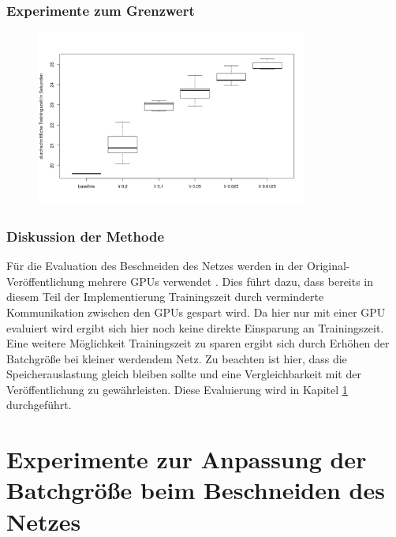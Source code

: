  
 
 \subsubsection{Experimente zum Grenzwert}


\begin{figure}[h]
 \centering
 \includegraphics[width=0.8\textwidth]{KapitelPartB/Images/lr1.png}
 \label{ref:lra}
\end{figure}



 

\subsubsection{Diskussion der Methode}

Für die Evaluation des Beschneiden des Netzes werden in der Original-Veröffentlichung mehrere GPUs verwendet \cite{prunetrain}. Dies führt dazu, dass bereits in diesem Teil der Implementierung Trainingszeit durch verminderte Kommunikation zwischen den GPUs gespart wird. Da hier nur mit einer GPU evaluiert wird ergibt sich hier noch keine direkte Einsparung an Trainingszeit. Eine weitere Möglichkeit Trainingszeit zu sparen ergibt sich durch Erhöhen der Batchgröße bei kleiner werdendem Netz. Zu beachten ist hier, dass die Speicherauslastung gleich bleiben sollte und eine Vergleichbarkeit mit der Veröffentlichung zu gewährleisten. Diese Evaluierung wird in Kapitel \ref{sec:ptnew} durchgeführt.


\section{Experimente zur Anpassung der Batchgröße beim Beschneiden des Netzes}\label{sec:ptnew}

